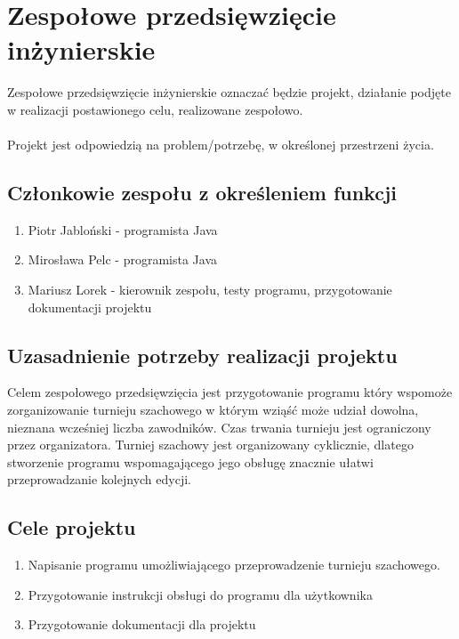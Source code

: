 \chapter{Zespołowe przedsięwzięcie inżynierskie}


Zespołowe przedsięwzięcie inżynierskie oznaczać będzie projekt, działanie podjęte w realizacji postawionego celu, realizowane zespołowo.\\\\
Projekt jest odpowiedzią na problem/potrzebę, w określonej przestrzeni życia.


\section{Członkowie zespołu z określeniem funkcji}
\begin{enumerate}
\item Piotr Jabloński - programista Java
\item Mirosława Pelc - programista Java
\item Mariusz Lorek - kierownik zespołu, testy programu, przygotowanie dokumentacji projektu
\end{enumerate}

\section{Uzasadnienie potrzeby realizacji projektu}
Celem zespołowego przedsięwzięcia jest przygotowanie programu który wspomoże zorganizowanie turnieju szachowego w którym wziąść może udział dowolna, nieznana wcześniej liczba zawodników. Czas trwania turnieju jest ograniczony przez organizatora. Turniej szachowy jest organizowany cyklicznie, dlatego stworzenie programu wspomagającego jego obsługę znacznie ułatwi przeprowadzanie kolejnych edycji.


\section{Cele projektu}

\begin{enumerate}
\item Napisanie programu umożliwiającego przeprowadzenie turnieju szachowego.
\item Przygotowanie instrukcji obsługi do programu dla użytkownika
\item Przygotowanie dokumentacji dla projektu
\end{enumerate}
 


